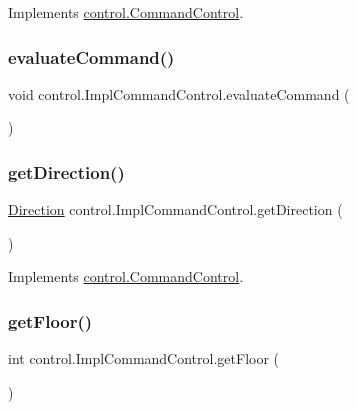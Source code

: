 Implements \mbox{\hyperlink{interfacecontrol_1_1_command_control_a9a32457770712105c8ceffab1c05b95a}{control.\+Command\+Control}}.

\mbox{\label{classcontrol_1_1_impl_command_control_abba34b3a552395174ddc686b4e3136dd}} 
\subsubsection{\texorpdfstring{evaluateCommand()}{evaluateCommand()}}
{\footnotesize\ttfamily void control.\+Impl\+Command\+Control.\+evaluate\+Command (\begin{DoxyParamCaption}{ }\end{DoxyParamCaption})\hspace{0.3cm}{\ttfamily [private]}}

\mbox{\label{classcontrol_1_1_impl_command_control_a9734880304099b72e4a65dbfe6a510a1}} 
\subsubsection{\texorpdfstring{getDirection()}{getDirection()}}
{\footnotesize\ttfamily \mbox{\hyperlink{enumcontrol_1_1command_1_1_direction}{Direction}} control.\+Impl\+Command\+Control.\+get\+Direction (\begin{DoxyParamCaption}{ }\end{DoxyParamCaption})}



Implements \mbox{\hyperlink{interfacecontrol_1_1_command_control_af668873aadd297c71867fa707b5ecd55}{control.\+Command\+Control}}.

\mbox{\label{classcontrol_1_1_impl_command_control_a03e231769f2023d9f381980a34057ad6}} 
\subsubsection{\texorpdfstring{getFloor()}{getFloor()}}
{\footnotesize\ttfamily int control.\+Impl\+Command\+Control.\+get\+Floor (\begin{DoxyParamCaption}{ }\end{DoxyParamCaption})}



